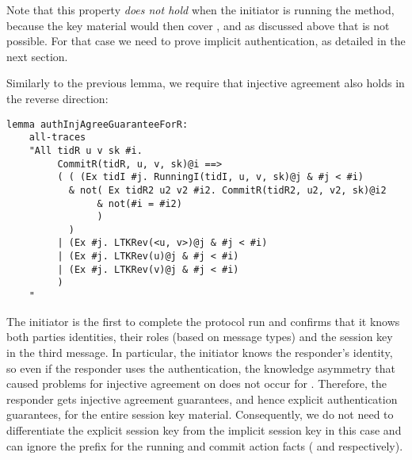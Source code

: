 Note that this property \emph{does not hold} when the initiator is
running the \mStat{} method, because the key material would then cover \mGiy{},
and as discussed above that is not possible.
%
For that case we need to prove implicit authentication, as detailed in
the next section.

Similarly to the previous lemma, we require that injective agreement also holds
in the reverse direction:
%

\begin{lstlisting}
lemma authInjAgreeGuaranteeForR:
    all-traces
    "All tidR u v sk #i.
         CommitR(tidR, u, v, sk)@i ==>
         ( ( (Ex tidI #j. RunningI(tidI, u, v, sk)@j & #j < #i)
           & not( Ex tidR2 u2 v2 #i2. CommitR(tidR2, u2, v2, sk)@i2
                & not(#i = #i2)
                )
           )
         | (Ex #j. LTKRev(<u, v>)@j & #j < #i)
         | (Ex #j. LTKRev(u)@j & #j < #i)
         | (Ex #j. LTKRev(v)@j & #j < #i)
         )
    "
\end{lstlisting}
%
The initiator is the first to complete the protocol run and confirms that
it knows both parties identities, their roles (based on message types) and the
session key in the third message.
%
In particular, the initiator knows the responder's identity, so even if the
responder uses the \mStat{} authentication, the knowledge asymmetry that caused
problems for injective agreement on \mGiy{} does not occur for \mGrx{}.
%
Therefore, the responder gets injective agreement guarantees, and hence explicit
authentication guarantees, for the entire session key material.
%
Consequently, we do not need to differentiate the explicit session key from the
implicit session key in this case and can ignore the  prefix for the
running and commit action facts ( and  respectively).
%
\\

